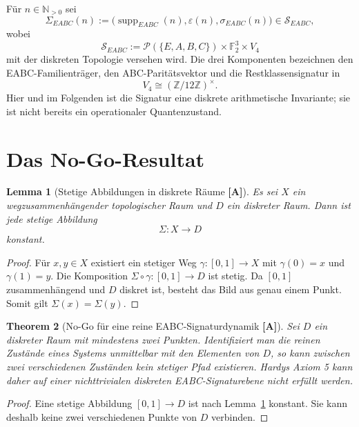 \documentclass[11pt,a4paper,reqno]{amsart}
\newtheorem{theorem}{Theorem}[section]
\newtheorem{lemma}[theorem]{Lemma}
\theoremstyle{definition}
\theoremstyle{remark}
\newcommand{\N}{\mathbb{N}}
\newcommand{\ZZ}{\mathbb{Z}}
\newcommand{\FF}{\mathbb{F}}
\newcommand{\Supp}{\operatorname{supp}}
\newcommand{\SEABC}{\mathcal{S}_{EABC}}
\newcommand{\StatusA}{\textnormal{\textbf{[A]}}}
\begin{document}
Für $n\in\N_{>0}$ sei
\begin{equation}
\Sigma_{EABC}(n)
:=
\bigl(
\Supp_{EABC}(n),\varepsilon(n),\sigma_{EABC}(n)
\bigr)
\in\SEABC,
\end{equation}
wobei
\begin{equation}
\SEABC
:=
\mathcal P(\{E,A,B,C\})\times\FF_2^3\times V_4
\end{equation}
mit der diskreten Topologie versehen wird. Die drei Komponenten bezeichnen den EABC-Familienträger, den ABC-Paritätsvektor und die Restklassensignatur in
\begin{equation}
V_4\cong (\ZZ/12\ZZ)^\times.
\end{equation}
Hier und im Folgenden ist die Signatur eine diskrete arithmetische Invariante; sie ist nicht bereits ein operationaler Quantenzustand.

\section{Das No-Go-Resultat}

\begin{lemma}[Stetige Abbildungen in diskrete Räume \StatusA]
\label{lem:discrete-map}
Es sei $X$ ein wegzusammenhängender topologischer Raum und $D$ ein diskreter Raum. Dann ist jede stetige Abbildung
\[
\Sigma:X\longrightarrow D
\]
konstant.
\end{lemma}

\begin{proof}
Für $x,y\in X$ existiert ein stetiger Weg $\gamma:[0,1]\to X$ mit $\gamma(0)=x$ und $\gamma(1)=y$. Die Komposition $\Sigma\circ\gamma:[0,1]\to D$ ist stetig. Da $[0,1]$ zusammenhängend und $D$ diskret ist, besteht das Bild aus genau einem Punkt. Somit gilt $\Sigma(x)=\Sigma(y)$.
\end{proof}

\begin{theorem}[No-Go für eine reine EABC-Signaturdynamik \StatusA]
\label{thm:no-go}
Sei $D$ ein diskreter Raum mit mindestens zwei Punkten. Identifiziert man die reinen Zustände eines Systems unmittelbar mit den Elementen von $D$, so kann zwischen zwei verschiedenen Zuständen kein stetiger Pfad existieren. Hardys Axiom 5 kann daher auf einer nichttrivialen diskreten EABC-Signaturebene nicht erfüllt werden.
\end{theorem}

\begin{proof}
Eine stetige Abbildung $[0,1]\to D$ ist nach Lemma~\ref{lem:discrete-map} konstant. Sie kann deshalb keine zwei verschiedenen Punkte von $D$ verbinden.
\end{proof}
\end{document}
